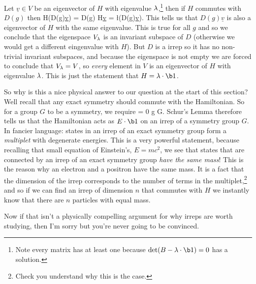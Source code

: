 \bq 
    Let $\underline{v}\in V$ be an eigenvector of $H$ with eigenvalue $\lambda$,\footnote{Note every matrix has at least one because $\det (B - \l\cdot \b1) = 0$ has a solution.} then if $H$ commutes with $D(g)$ then 
    \bse 
        H\big(D(g)\underline{v}\big) = D(g) H\underline{v} = \l \cdot \big(D(g)\underline{v}\big).
    \ese
    This tells us that $D(g)\underline{v}$ is also a eigenvector of $H$ with the same eigenvalue. This is true for all $g$ and so we conclude that the eigenspace $V_{\lambda}$ is an invariant subspace of $D$ (otherwise we would get a different eingenvalue with $H$). But $D$ is a irrep so it has no non-trivial invariant subspaces, and because the eigenspace is not empty we are forced to conclude that $V_{\lambda} = V$, so \textit{every} element in $V$ is an eigenvector of $H$ with eigenvalue $\lambda$. This is just the statement that $H = \l \cdot \b1$.
\eq 

So why is this a nice physical answer to our question at the start of this section? Well recall that any exact symmetry should commute with the Hamiltonian. So for a group $G$ to be a symmetry, we require 
\bse 
    [H,D(g)] = 0 \qquad \forall g \in G.
\ese 
Schur's Lemma therefore tells us that the Hamiltonian acts as $E\cdot \b1$ on an irrep of a symmetry group $G$. In fancier language: states in an irrep of an exact symmetry group form a \textit{multiplet} with degenerate energies. This is a very powerful statement, because recalling that small equation of Einstein's, $E=mc^2$, we see that states that are connected by an irrep of an exact symmetry group \textit{have the same mass}! This is the reason why an electron and a positron have the same mass. It is a fact that the dimension of the irrep corresponds to the number of terms in the multiplet,\footnote{Check you understand why this is the case.} and so if we can find an irrep of dimension $n$ that commutes with $H$ we instantly know that there are $n$ particles with equal mass. 

Now if that isn't a physically compelling argument for why irreps are worth studying, then I'm sorry but you're never going to be convinced. 
